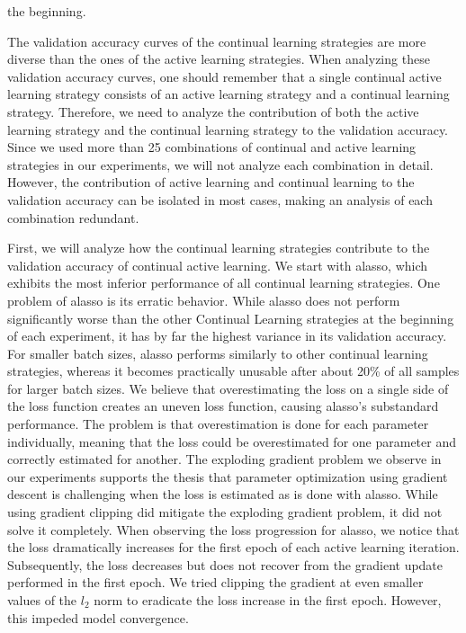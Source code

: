 the beginning. \par
The validation accuracy curves of the continual learning strategies are more diverse than the ones of the active learning strategies. When analyzing these
validation accuracy curves, one should remember that a single continual active learning strategy consists of an active learning
strategy and a continual learning strategy. Therefore, we need to analyze the contribution of both the active learning strategy and the continual learning
strategy to the validation accuracy. Since we used more than 25 combinations of continual and active learning strategies in our experiments, we will not
analyze each combination in detail. However, the contribution of active learning and continual learning to the validation
accuracy can be isolated in most cases, making an analysis of each combination redundant. \par
First, we will analyze how the continual learning strategies contribute to the validation accuracy of continual active learning. We start with \gls{alasso},
which exhibits the most inferior performance of all continual learning strategies. One problem of \gls{alasso} is its erratic behavior. While
\gls{alasso} does not perform significantly worse than the other Continual Learning strategies at the beginning of each experiment, it has by far the highest
variance in its validation accuracy. For smaller batch sizes, \gls{alasso} performs similarly to other continual learning strategies, whereas it becomes practically
unusable after about 20\% of all samples for larger batch sizes. We believe that overestimating the loss on a single side of the loss function creates an uneven loss function,
causing \gls{alasso}'s substandard performance. The problem is that overestimation is done for each parameter individually, meaning that the loss could be
overestimated for one parameter and correctly estimated for another. The exploding gradient problem we observe in our experiments supports the thesis that
parameter optimization using gradient descent is challenging when the loss is estimated as is done with \gls{alasso}. While using gradient clipping did mitigate the
exploding gradient problem, it did not solve it completely. When observing the loss progression for \gls{alasso}, we notice that the loss dramatically increases
for the first epoch of each active learning iteration. Subsequently, the loss decreases but does not recover from the gradient update performed in the first epoch.
We tried clipping the gradient at even smaller values of the $l_2$ norm to eradicate the loss increase in the first epoch. However, this impeded model convergence. \par
